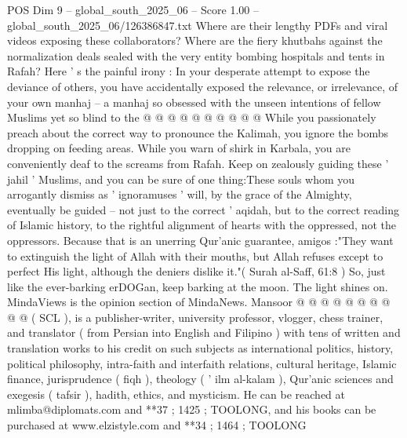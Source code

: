 \begin{textsample}{POS Dim 9 – global\_south\_2025\_06 – Score 1.00 – global\_south\_2025\_06/126386847.txt}
Where are their lengthy PDFs and viral videos exposing these collaborators?
Where are the fiery khutbahs against the normalization deals sealed with the very entity bombing hospitals and tents in Rafah?
Here ' s the painful irony : In your desperate attempt to expose the deviance of others, you have accidentally exposed the relevance, or irrelevance, of your own manhaj -- a manhaj so obsessed with the unseen intentions of fellow Muslims yet so blind to the @ @ @ @ @ @ @ @ @ @ While you passionately preach about the correct way to pronounce the Kalimah, you ignore the bombs dropping on feeding areas.
While you warn of shirk in Karbala, you are conveniently deaf to the screams from Rafah.
Keep on zealously guiding these ' jahil ' Muslims, and you can be sure of one thing:These souls whom you arrogantly dismiss as ' ignoramuses ' will, by the grace of the Almighty, eventually be guided -- not just to the correct ' aqidah, but to the correct reading of Islamic history, to the rightful alignment of hearts with the oppressed, not the oppressors.
Because that is an unerring Qur'anic guarantee, amigos :"They want to extinguish the light of Allah with their mouths, but Allah refuses except to perfect His light, although the deniers dislike it."( Surah al-Saff, 61:8 ) So, just like the ever-barking erDOGan, keep barking at the moon.
The light shines on.
MindaViews is the opinion section of MindaNews.
Mansoor @ @ @ @ @ @ @ @ @ @ ( SCL ), is a publisher-writer, university professor, vlogger, chess trainer, and translator ( from Persian into English and Filipino ) with tens of written and translation works to his credit on such subjects as international politics, history, political philosophy, intra-faith and interfaith relations, cultural heritage, Islamic finance, jurisprudence ( fiqh ), theology ( ' ilm al-kalam ), Qur'anic sciences and exegesis ( tafsir ), hadith, ethics, and mysticism.
He can be reached at mlimba@diplomats.com and **37 ; 1425 ; TOOLONG, and his books can be purchased at www.elzistyle.com and **34 ; 1464 ; TOOLONG

\end{textsample}
